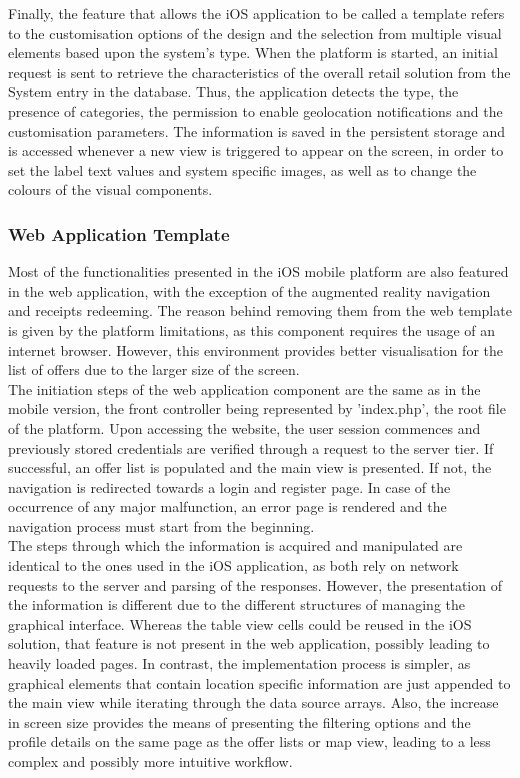 Finally, the feature that allows the iOS application to be called a template refers to the customisation options of the design and the selection from multiple visual elements based upon the system's type. When the platform is started, an initial request is sent to retrieve the characteristics of the overall retail solution from the System entry in the database. Thus, the application detects the type, the presence of categories, the permission to enable geolocation notifications and the customisation parameters. The information is saved in the persistent storage and is accessed whenever a new view is triggered to appear on the screen, in order to set the label text values and system specific images, as well as to change the colours of the visual components.

\subsubsection{Web Application Template}

Most of the functionalities presented in the iOS mobile platform are also featured in the web application, with the exception of the augmented reality navigation and receipts redeeming. The reason behind removing them from the web template is given by the platform limitations, as this component requires the usage of an internet browser. However, this environment provides better visualisation for the list of offers due to the larger size of the screen. \\

The initiation steps of the web application component are the same as in the mobile version, the front controller being represented by 'index.php', the root file of the platform. Upon accessing the website, the user session commences and previously stored credentials are verified through a request to the server tier. If successful, an offer list is populated and the main view is presented. If not, the navigation is redirected towards a login and register page. In case of the occurrence of any major malfunction, an error page is rendered and the navigation process must start from the beginning. \\

The steps through which the information is acquired and manipulated are identical to the ones used in the iOS application, as both rely on network requests to the server and parsing of the responses. However, the presentation of the information is different due to the different structures of managing the graphical interface. Whereas the table view cells could be reused in the iOS solution, that feature is not present in the web application, possibly leading to heavily loaded pages. In contrast, the implementation process is simpler, as graphical elements that contain location specific information are just appended to the main view while iterating through the data source arrays. Also, the increase in screen size provides the means of presenting the filtering options and the profile details on the same page as the offer lists or map view, leading to a less complex and possibly more intuitive workflow.\\

